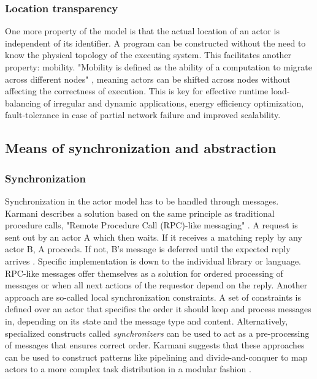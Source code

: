 \documentclass[A4]{article}
\begin{document}
\subsubsection{Location transparency}
One more property of the model is that the actual location of an actor is independent of its identifier. A program can be constructed without the need to know the physical topology of the executing system. This facilitates another property: mobility.
"Mobility is defined as the ability of a computation to migrate across different nodes" \cite[p.~5]{reference/parallel/KarmaniA11}, meaning actors can be shifted across nodes without affecting the correctness of execution. This is key for effective runtime load-balancing of irregular and dynamic applications, energy efficiency optimization, fault-tolerance in case of partial network failure and improved scalability. 

\subsection{Means of synchronization and abstraction}
\subsubsection{Synchronization}
Synchronization in the actor model  has to be handled through messages. Karmani describes a solution based on the same principle as traditional procedure calls, "Remote Procedure Call (RPC)-like messaging" \cite[p.~6]{reference/parallel/KarmaniA11}. A request is sent out by an actor A which then waits. If it receives a matching reply by any actor B, A proceeds. If not, B's message is deferred until the expected reply arrives \cite[p.~6]{reference/parallel/KarmaniA11}. Specific implementation is down to the individual library or language.
RPC-like messages offer themselves as a solution for ordered processing of messages or when all next actions of the requestor depend on the reply. 
Another approach are so-called local synchronization constraints. A set of constraints is defined over an actor that specifies the order it should keep and process messages in, depending on its state and the message type and content. \cite[p.~34]{Agha2016:2}
Alternatively, specialized constructs called {\it synchronizers} can be used to act as a pre-processing of messages that ensures correct order.
Karmani suggests that these approaches can be used to construct patterns like pipelining and divide-and-conquer to map actors to a more complex task distribution in a modular fashion \cite[p.~6]{reference/parallel/KarmaniA11}.
\end{document}
